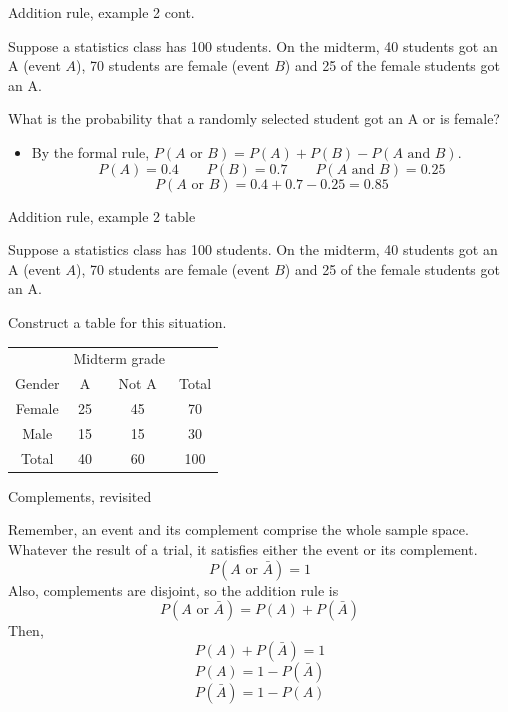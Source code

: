 \documentclass[xcolor=table]{beamer}
\begin{document}
\begin{frame}{Addition rule, example 2 cont.}
\begin{block}{}
Suppose a statistics class has 100 students. On the midterm, 40 students got an A (event $A$),  70 students are female (event $B$) and 25 of the female students got an A.
\end{block}

\begin{exampleblock}{}
What is the probability that a randomly selected student got an A or is female?
\begin{itemize}
\pause
\item By the formal rule, $P(A \text{ or } B) = P(A) + P(B) - P(A \text{ and } B)$.
\[P(A) = 0.4 \qquad P(B) = 0.7 \qquad P(A \text{ and } B) = 0.25\]
\[P(A \text{ or } B) = 0.4 + 0.7 - 0.25 = 0.85\]
\end{itemize}
\end{exampleblock}
\end{frame}

\begin{frame}{Addition rule, example 2 table}
\begin{block}{}
Suppose a statistics class has 100 students. On the midterm, 40 students got an A (event $A$),  70 students are female (event $B$) and 25 of the female students got an A.
\end{block}

\begin{exampleblock}{}
Construct a table for this situation.\\
\pause
\medskip
{\centering
\begin{tabular}{c | c  c | c}
\multicolumn{1}{c}{} & \multicolumn{2}{c}{Midterm grade}\\
Gender & A & Not A & Total\\
\hline
Female & 25 & 45 & 70\\
Male & 15 & 15 & 30 \\
\hline
Total & 40 & 60 & 100
\end{tabular}\par
}
\end{exampleblock}
\end{frame}

\begin{frame}{Complements, revisited}
\begin{block}{}
Remember, an event and its complement comprise the whole sample space. Whatever the result of a trial, it satisfies either the event or its complement.
\[P(A \text{ or } \bar A) = 1 \]
\pause
Also, complements are disjoint, so the addition rule is
\[P(A \text{ or } \bar A) = P(A) + P(\bar A) \]
\pause
Then,
\[P(A) + P(\bar A) = 1 \]
\[P(A) = 1 -  P(\bar A) \]
\[P(\bar A) = 1 - P(A) \]


\end{block}
\end{frame}
\end{document}
